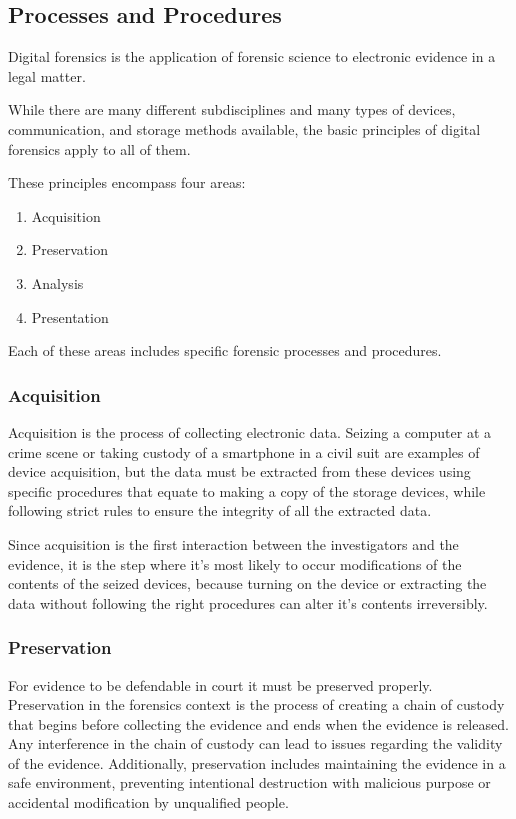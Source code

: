 \subsection{Processes and Procedures}

Digital forensics is the application of forensic science to electronic evidence in a
legal matter.

While there are many different subdisciplines and many types of devices, communication,
and storage methods available, the basic principles of digital forensics
apply to all of them.

These principles encompass four areas:

\begin{enumerate}
\item Acquisition
\item Preservation
\item Analysis
\item Presentation
\end{enumerate}

Each of these areas includes specific forensic processes and procedures.

\subsubsection*{Acquisition}

Acquisition is the process of collecting electronic data. Seizing a computer at a crime scene or
taking custody of a smartphone in a civil suit are examples of device acquisition, but the data 
must be extracted from these devices using specific procedures that equate to making a copy of
the storage devices, while following strict rules to ensure the integrity of all the extracted data.

Since acquisition is the first interaction between the investigators and the evidence,
it is the step where it's most likely to occur modifications of the contents of the seized devices,
because turning on the device or extracting the data without following the right procedures can alter
it's contents irreversibly.

\subsubsection*{Preservation}

For evidence to be defendable in court it must be preserved properly.
Preservation in the forensics context is the process of creating a chain of custody
that begins before collecting the evidence and ends when the evidence is released.
Any interference in the chain of custody can lead to issues regarding the validity of the evidence.
Additionally, preservation includes maintaining the evidence in a safe environment, preventing
intentional destruction with malicious purpose or accidental modification by unqualified people.

